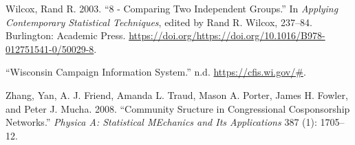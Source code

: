 \documentclass[12pt,]{article}
\begin{document}
\leavevmode\hypertarget{ref-wilcox2003}{}%
Wilcox, Rand R. 2003. ``8 - Comparing Two Independent Groups.'' In
\emph{Applying Contemporary Statistical Techniques}, edited by Rand R.
Wilcox, 237--84. Burlington: Academic Press.
\url{https://doi.org/https://doi.org/10.1016/B978-012751541-0/50029-8}.

\leavevmode\hypertarget{ref-cfis}{}%
``Wisconsin Campaign Information System.'' n.d.
\url{https://cfis.wi.gov/\#}.

\leavevmode\hypertarget{ref-zhang2008}{}%
Zhang, Yan, A. J. Friend, Amanda L. Traud, Mason A. Porter, James H.
Fowler, and Peter J. Mucha. 2008. ``Community Sructure in Congressional
Cosponsorship Networks.'' \emph{Physica A: Statistical MEchanics and Its
Applications} 387 (1): 1705--12.





\newpage
\singlespacing 
\end{document}
